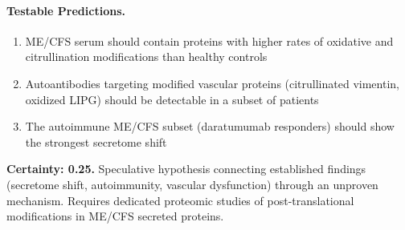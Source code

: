 \begin{speculation}
\paragraph{Testable Predictions.}
\begin{enumerate}
    \item ME/CFS serum should contain proteins with higher rates of oxidative and citrullination modifications than healthy controls
    \item Autoantibodies targeting modified vascular proteins (citrullinated vimentin, oxidized LIPG) should be detectable in a subset of patients
    \item The autoimmune ME/CFS subset (daratumumab responders) should show the strongest secretome shift
\end{enumerate}

\textbf{Certainty: 0.25.} Speculative hypothesis connecting established findings (secretome shift, autoimmunity, vascular dysfunction) through an unproven mechanism. Requires dedicated proteomic studies of post-translational modifications in ME/CFS secreted proteins.
\end{speculation}

